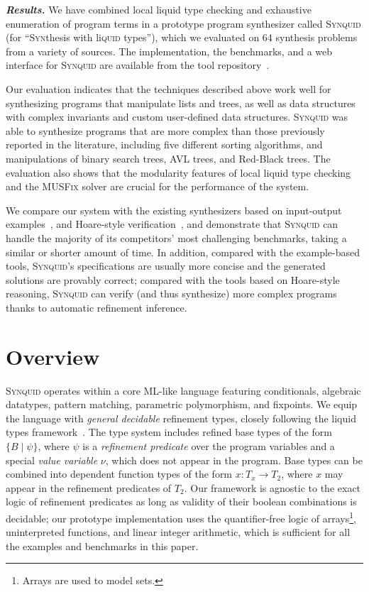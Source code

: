 \documentclass[10pt,preprint]{sigplanconf-pldi16}
\theoremstyle{definition}
\newcommand{\custompar}[1]{\parskip 0pt \textbf{\textit{#1}}}
\newcommand{\funT}[3]{{#1}\colon {#2} \to {#3}}
\newcommand{\tool}{\textsc{Synquid}\xspace}
\newcommand{\exCount}{64\xspace}
\begin{document}
\custompar{Results.}
We have combined local liquid type checking and exhaustive enumeration of program terms
in a prototype program synthesizer called \tool 
(for ``\textsc{Syn}thesis with li\textsc{quid} types''),
which we evaluated on \exCount synthesis problems from a variety of sources.
The implementation, the benchmarks, 
and a web interface for \tool are available from the tool repository~\cite{SynquidRepo}.

Our evaluation indicates that the techniques described above work well
for synthesizing programs that manipulate lists and trees, 
as well as data structures with complex invariants
and custom user-defined data structures.
\tool was able to synthesize programs that are more complex than those previously reported in the literature,
including five different sorting algorithms, and manipulations of binary search trees, AVL trees, and Red-Black trees.
The evaluation also shows that the modularity features of local liquid type checking
and the \textsc{MUSFix} solver are crucial for the performance of the system.

We compare our system with the existing synthesizers 
based on input-output examples~\cite{AlbarghouthiGuKi13,OseraZd15,FeserChDi15,FrankleOWZ16},
and Hoare-style verification~\cite{LeinoMi12,KneussKuKuSu13},
and demonstrate that \tool can handle the majority of its competitors' most challenging benchmarks,
taking a similar or shorter amount of time.
In addition, compared with the example-based tools,
\tool's specifications are usually more concise and the generated solutions are provably correct;
compared with the tools based on Hoare-style reasoning, 
\tool can verify (and thus synthesize) more complex programs thanks to automatic refinement inference.



\section{Overview}\label{sec:overview}

\tool operates within a core ML-like language featuring conditionals, algebraic datatypes, pattern matching, parametric polymorphism, and fixpoints.
We equip the language with \emph{general decidable} refinement types,
closely following the liquid types framework~\cite{RondonKaJh08,KawaguchiRoJh09,VazouRoJh13}.
The type system includes refined base types of the form $\{B\mid\psi\}$,
where $\psi$ is a \emph{refinement predicate} over the program variables and a special \emph{value variable} $\nu$, which does not appear in the program.
Base types can be combined into dependent function types of the form $\funT{x}{T_x}{T_2}$,
where $x$ may appear in the refinement predicates of $T_2$.
Our framework is agnostic to the exact logic of refinement predicates as long as validity of their boolean combinations is decidable;
our prototype implementation uses the quantifier-free logic of arrays\footnote{Arrays are used to model sets.}, uninterpreted functions, and linear integer arithmetic,
which is sufficient for all the examples and benchmarks in this paper.
\end{document}
